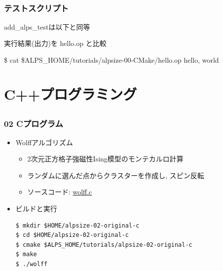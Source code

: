 \subsection*{\redm\whitem\greenb}
\begin{frame}
  \frametitle{テストスクリプト}
add\_alps\_testは以下と同等
実行結果(出力)を hello.op と比較
\begin{semiverbatim}
\$ cat \$ALPS_HOME/tutorials/alpsize-00-CMake/hello.op
hello, world
\end{semiverbatim}
\end{frame}

\section{C++プログラミング}

\subsection*{\redm\whitem\greenb}
\begin{frame}[fragile]
  \frametitle{02 Cプログラム}
  \begin{itemize}
    \item Wolffアルゴリズム
      \begin{itemize}
        \item 2次元正方格子強磁性Ising模型のモンテカルロ計算
        \item ランダムに選んだ点からクラスターを作成し, スピン反転
        \item ソースコード: \href{https://github.com/cmsi/alps-tutorial/blob/develop/alpsize/02-wolff.c}{wolff.c}
      \end{itemize}
    \item ビルドと実行
\begin{lstlisting}
$ mkdir $HOME/alpsize-02-original-c
$ cd $HOME/alpsize-02-original-c
$ cmake $ALPS_HOME/tutorials/alpsize-02-original-c
$ make
$ ./wolff
\end{lstlisting}
\end{itemize}
\end{frame}

